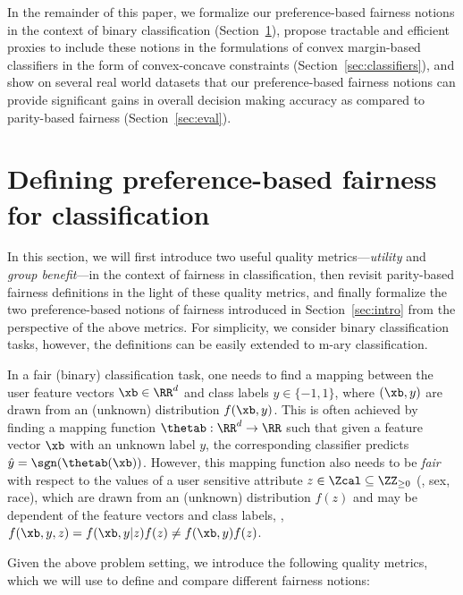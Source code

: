 \documentclass{article}
\newcommand{\xhdr}[1]{\vspace{0mm}\noindent{{\bf #1.}}}
\begin{document}
In the remainder of this paper,
we  formalize our preference-based fairness notions in the context of binary classification (Section~\ref{classifying_discrimination}),
propose tractable and efficient proxies to include these notions in the formulations of convex margin-based classifiers in the form of convex-concave constraints (Section~\ref{sec:classifiers}), and show on several real world datasets that our preference-based fairness notions can provide significant gains in overall decision making accuracy as compared to parity-based fairness (Section~\ref{sec:eval}).


\section{Defining preference-based fairness for classification}\label{classifying_discrimination}
In this section, we will first introduce two useful quality metrics---\emph{utility} and \emph{group benefit}---in the context of fairness in classification, then revisit parity-based
fairness definitions in the light of these quality metrics, and finally formalize the two preference-based notions of fairness introduced in Section~\ref{sec:intro} from the perspective
of the above metrics.
For simplicity, we consider binary classification tasks, however, the definitions can be easily extended to m-ary classification.

\xhdr{Quality metrics in fair classification}
In a fair (binary) classification task, one needs to find a mapping between the user feature vectors $\xb \in \RR^{d}$
and class labels $y \in \{-1, 1\}$, where $(\xb, y)$ are drawn from an (unknown) distribution $f(\xb, y)$.
This is often achieved by finding a mapping function $\thetab: \RR^d \to \RR$ such that given a feature vector $\xb$ with an unknown label $y$, the corresponding classifier predicts $\hat{y} = \sgn(\thetab(\xb))$.
However, this mapping function also needs to be \emph{fair} with respect to the values of a user sensitive attribute $z \in \Zcal \subseteq \ZZ_{\geq 0}$ (\eg,
sex, race), which are drawn from an (unknown) distribution $f(z)$ and may be dependent of the feature vectors and class
labels, \ie, $f(\xb, y, z) = f(\xb, y | z) f(z) \neq f(\xb, y) f(z)$.

Given the above problem setting, we introduce the following quality metrics, which we will use to define and compare different fairness notions:
\end{document}
